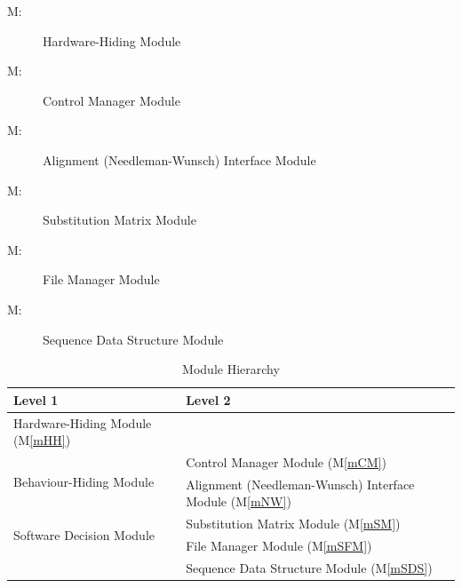 \documentclass[12pt, titlepage]{article}
\newcounter{mnum}
\newcommand{\mthemnum}{M\themnum}
\newcommand{\mref}[1]{M\ref{#1}}
\begin{document}
\begin{description}
  \item [ \mthemnum \label{mHH}:] Hardware-Hiding Module
  \item [ \mthemnum \label{mCM}:] Control Manager Module
  \item [ \mthemnum \label{mNW}:] Alignment (Needleman-Wunsch) Interface Module
  \item [ \mthemnum \label{mSM}:] Substitution Matrix Module
  \item [ \mthemnum \label{mSFM}:] File Manager Module
  \item [ \mthemnum \label{mSDS}:] Sequence Data Structure Module
\end{description}


\begin{table}[h!]
  \centering
  \begin{tabular}{p{} p{}}
  \toprule
  \textbf{Level 1} & \textbf{Level 2}\\
  \midrule
  
  {Hardware-Hiding Module (\mref{mHH})} & ~ \\
  \midrule
  
  \multirow{2}{0.3\textwidth}{Behaviour-Hiding Module} & Control Manager Module (\mref{mCM}) \\
  & Alignment (Needleman-Wunsch) Interface Module (\mref{mNW}) \\
  \midrule
  
  \multirow{2}{0.3\textwidth}{Software Decision Module} & Substitution Matrix Module (\mref{mSM}) \\
  & File Manager Module (\mref{mSFM}) \\ & Sequence Data Structure Module (\mref{mSDS}) \\
  \bottomrule
  
  \end{tabular}
  \caption{Module Hierarchy}
  \label{TblMH}
\end{table}
\end{document}
